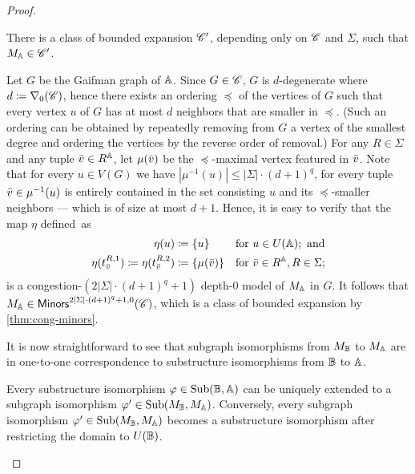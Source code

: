 \begin{proof}
	\begin{claim}\label{cl:still-bnd}
		There is a class of bounded expansion $\mathscr C'$, depending only on $\mathscr C$ and $\Sigma$, such that
		$M_{\mathbb{A}}\in \mathscr C'$.
	\end{claim}
	\begin{claimproof}
		Let $G$ be the Gaifman graph of $\mathbb{A}$. Since $G\in \mathscr C$, $G$ is $d$-degenerate where $d\coloneqq \nabla_0(\mathscr C)$, hence there exists an ordering $\preceq$ of the vertices of $G$ such that every vertex $u$ of $G$ has at most $d$ neighbors that are smaller in $\preceq$. (Such an ordering can be obtained by repeatedly removing from $G$ a vertex of the smallest degree and ordering the vertices by the reverse order of removal.) For any $R\in \Sigma$ and any tuple ${\bar{v}}\in R^{\mathbb{A}}$, let $\mu({\bar{v}})$ be the $\preceq$-maximal vertex featured in ${\bar{v}}$. Note that for every $u\in V(G)$ we have $|\mu^{-1}(u)|\leq |\Sigma|\cdot (d+1)^q$,
		for every tuple ${\bar{v}}\in \mu^{-1}(u)$ is entirely contained in the set consisting $u$ and its $\preceq$-smaller neighbors --- which is of size at most $d+1$.
		Hence, it is easy to verify that the map $\eta$ defined~as
		\begin{align*}
			\eta(u)& \coloneqq \{u\} && \textrm{for }u\in U(\mathbb{A});\textrm{ and}\\
			\eta(t^{R,1}_{\bar{v}})\coloneqq \eta(t^{R,2}_{\bar{v}})& \coloneqq \{\mu({\bar{v}})\} && \textrm{for }{\bar{v}}\in R^{\mathbb{A}}, R\in \Sigma;
		\end{align*} 
		is a congestion-$(2|\Sigma|\cdot (d+1)^q+1)$ depth-$0$ model of $M_{\mathbb{A}}$ in $G$. It follows that $M_{\mathbb{A}}\in \mathsf{Minors}^{2|\Sigma|\cdot (d+1)^q+1,0}(\mathscr C)$, which is a class of bounded expansion by \cref{thm:cong-minors}.
	\end{claimproof}
	
	It is now straightforward to see that subgraph isomorphisms from $M_{\mathbb{B}}$ to $M_{\mathbb{A}}$ are in one-to-one correspondence to substructure isomorphisms from $\mathbb{B}$ to $\mathbb{A}$. %
	
	\begin{claim}\label{cl:subgraph-works}
		Every substructure isomorphism $\varphi\in \mathrm{Sub}(\mathbb{B},\mathbb{A})$ can be uniquely extended to a subgraph isomorphism $\varphi'\in \mathrm{Sub}(M_{\mathbb{B}},M_{\mathbb{A}})$. Conversely, every subgraph isomorphism $\varphi'\in \mathrm{Sub}(M_{\mathbb{B}},M_{\mathbb{A}})$ becomes a substructure isomorphism after restricting the domain to $U(\mathbb{B})$.
	\end{claim}
	

\end{proof}
